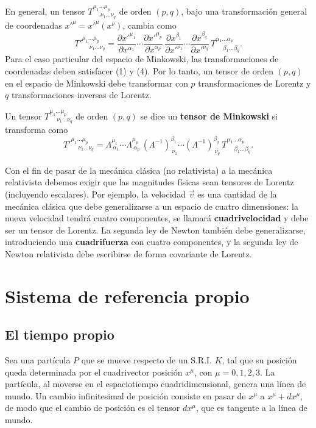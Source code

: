 En general, un tensor $T^{\mu_1\dots\mu_p}_{\quad\ \nu_1\dots\nu_q}$ de
orden $(p,q)$, bajo una transformación general de coordenadas
$x'^\mu=x'^\mu(x^\nu)$, cambia como
\[
T'^{\mu_1\dots\mu_p}_{\quad\ \nu_1\dots\nu_q} = \frac{\partial
x'^{\mu_1}}{\partial x^{\alpha_1}}\cdots\frac{\partial
x'^{\mu_p}}{\partial x^{\alpha_p}}\,\frac{\partial x^{\beta_1}}{\partial
x'^{\nu_1}}\cdots\frac{\partial x^{\beta_q}}{\partial x'^{\nu_q}}\,
T^{\alpha_1\dots\alpha_p}_{\quad\ \beta_1\dots\beta_q}.
\]
Para el caso particular del espacio de Minkowski, las transformaciones de
coordenadas deben satisfacer (1) y (4). Por lo tanto, un tensor de orden
$(p,q)$ en el espacio de Minkowski debe transformar con $p$
transformaciones de Lorentz y $q$ transformaciones inversas de Lorentz.

\begin{definicion}
Un tensor $T^{\mu_1\dots\mu_p}_{\quad\ \nu_1\dots\nu_q}$ de orden
$(p,q)$ se dice un \textbf{tensor de Minkowski} si transforma como
\[
T'^{\mu_1\dots\mu_p}_{\quad\ \nu_1\dots\nu_q} = \Lambda^{\mu_1}_{\
\alpha_1}\cdots\Lambda^{\mu_p}_{\ \alpha_p}\,(\Lambda^{-1})^{\beta_1}_{\
\nu_1}\cdots(\Lambda^{-1})^{\beta_q}_{\ \nu_q}\,T^{\alpha_1\dots
\alpha_p}_{\quad\ \beta_1\dots\beta_q}. \tag{7}
\]
\end{definicion}

Con el fin de pasar de la mecánica clásica (no relativista) a la
mecánica relativista debemos exigir que las magnitudes físicas sean
tensores de Lorentz (incluyendo escalares). Por ejemplo, la velocidad
$\vec v$ es una cantidad de la mecánica clásica que debe generalizarse a
un espacio de cuatro dimensiones: la nueva velocidad tendrá cuatro
componentes, se llamará \textbf{cuadrivelocidad} y debe ser un tensor de
Lorentz. La segunda ley de Newton también debe generalizarse,
introduciendo una \textbf{cuadrifuerza} con cuatro componentes, y la
segunda ley de Newton relativista debe escribirse de forma covariante de
Lorentz.

\section{Sistema de referencia propio}

\subsection{El tiempo propio}

Sea una partícula $P$ que se mueve respecto de un S.R.I. $K$, tal que su
posición queda determinada por el cuadrivector posición $x^\mu$, con
$\mu=0,1,2,3$. La partícula, al moverse en el espaciotiempo
cuadridimensional, genera una línea de mundo. Un cambio infinitesimal de
posición consiste en pasar de $x^\mu$ a $x^\mu+dx^\mu$, de modo que el
cambio de posición es el tensor $dx^\mu$, que es tangente a la línea de
mundo.

